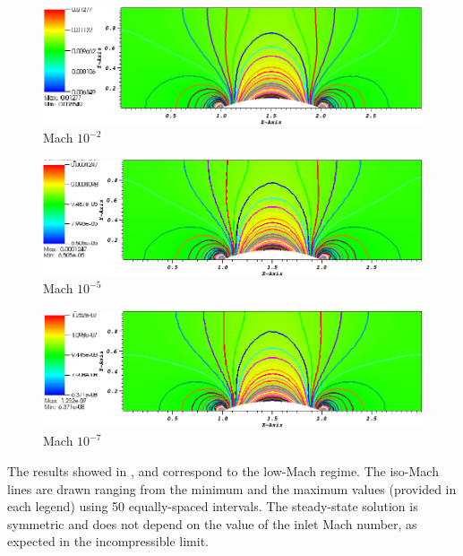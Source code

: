         \begin{figure}[H]
                \centering
                \includegraphics[width=\textwidth]{figures/Hump2D_mach_0p01.png}
                \caption{Mach $10^{-2}$}
                \label{fig:2d_hump_mach_0p01}
        \end{figure}%
        
        \begin{figure}[H]
                \centering
                \includegraphics[width=\textwidth]{figures/Hump2D_mach_1em4.png}
                \caption{Mach $10^{-5}$}
                \label{fig:2d_hump_mach_0p0001}
        \end{figure}

        \begin{figure}[H]
                \centering
                \includegraphics[width=\textwidth]{figures/Hump2D_mach_1em7.png}
                \caption{Mach $10^{-7}$}
                \label{fig:2d_hump_mach_0p0000001}
        \end{figure}
%
The results showed in ,  and  correspond to the low-Mach regime. The iso-Mach lines are drawn ranging from the minimum and the maximum values (provided in each legend) using 50 equally-spaced intervals. The steady-state solution is symmetric and does not depend on the value of the inlet Mach number, as expected in the incompressible limit. 

